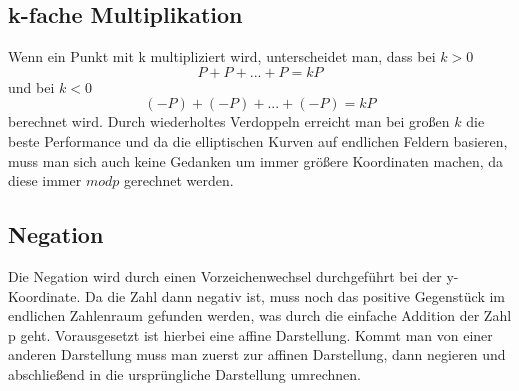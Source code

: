 \subsection{k-fache Multiplikation}
Wenn ein Punkt mit k multipliziert wird, unterscheidet man, dass bei \(k > 0\) \[P + P + ... + P = kP\] und bei \(k < 0\) \[ (-P) + (-P) + ... + (-P) = kP\] berechnet wird. Durch wiederholtes Verdoppeln erreicht man bei großen \(k\) die beste Performance und da die elliptischen Kurven auf endlichen Feldern basieren, muss man sich auch keine Gedanken um immer größere Koordinaten machen, da diese immer \( mod p\) gerechnet werden.
\subsection{Negation}
Die Negation wird durch einen Vorzeichenwechsel durchgeführt bei der y-Koordinate. Da die Zahl dann negativ ist, muss noch das positive Gegenstück im endlichen Zahlenraum gefunden werden, was durch die einfache Addition der Zahl p geht. Vorausgesetzt ist hierbei eine affine Darstellung. Kommt man von einer anderen Darstellung muss man zuerst zur affinen Darstellung, dann negieren und abschließend in die ursprüngliche Darstellung umrechnen.